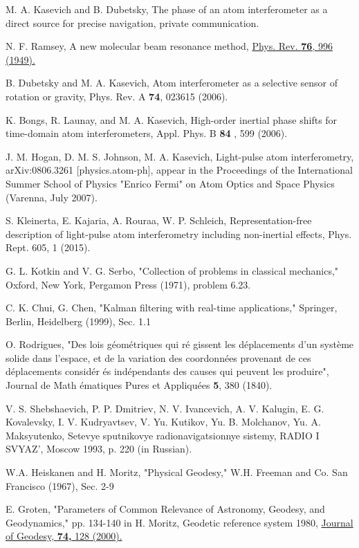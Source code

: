 \documentclass[twocolumn,showpacs,preprintnumbers]{revtex4}
\begin{document}
\begin{thebibliography}{99}
 M. A. Kasevich and B. Dubetsky, The phase of an atom
interferometer as a direct source for precise navigation, private
communication.

 N. F. Ramsey, A new molecular beam resonance method, \href{https://doi.org/10.1103/PhysRev.76.996}%
{Phys. Rev. \textbf{76}, 996 (1949).}

 B. Dubetsky and M. A. Kasevich, Atom interferometer as a
selective sensor of rotation or gravity, Phys. Rev. A \textbf{74}, 023615
(2006).

 K. Bongs, R. Launay, and M. A. Kasevich, High-order inertial
phase shifts for time-domain atom interferometers, Appl. Phys. B \textbf{84}%
, 599 (2006).

 J. M. Hogan, D. M. S. Johnson, M. A. Kasevich, Light-pulse
atom interferometry, arXiv:0806.3261 [physics.atom-ph], appear in the
Proceedings of the International Summer School of Physics "Enrico Fermi" on
Atom Optics and Space Physics (Varenna, July 2007).

 S. Kleinerta, E. Kajaria, A. Rouraa, W. P. Schleich,
Representation-free description of light-pulse atom interferometry including
non-inertial effects, Phys. Rept. 605, 1 (2015).

 G. L. Kotkin and V. G. Serbo, "Collection of problems in
classical mechanics," Oxford, New York, Pergamon Press (1971), problem 6.23.

 C. K. Chui, G. Chen, "Kalman filtering with real-time
applications," Springer, Berlin, Heidelberg (1999), Sec. 1.1

 O. Rodrigues, "Des lois g\'{e}om\'{e}triques qui r\'{e}%
gissent les d\'{e}placements d'un syst\`{e}me solide dans l'espace, et de la
variation des coordonn\'{e}es provenant de ces d\'{e}placements consid\'{e}r%
\'{e}s ind\'{e}pendants des causes qui peuvent les produire", Journal de Math%
\'{e}matiques Pures et Appliqu\'{e}es \textbf{5}, 380 (1840).

 V. S. Shebshaevich, P. P. Dmitriev, N. V. Ivancevich, A. V.
Kalugin, E. G. Kovalevsky, I. V. Kudryavtsev, V. Yu. Kutikov, Yu. B.
Molchanov, Yu. A. Maksyutenko, Setevye sputnikovye radionavigatsionnye
sistemy, RADIO I SVYAZ', Moscow 1993, p. 220 (in Russian).

 W.A. Heiskanen and H. Moritz, "Physical Geodesy," W.H. Freeman
and Co. San Francisco (1967), Sec. 2-9

 E. Groten, "Parameters of Common Relevance of Astronomy,
Geodesy, and Geodynamics," pp. 134-140 in H. Moritz, Geodetic reference
system 1980, \href{https://doi.org/10.1007/s001900050278}{Journal of
Geodesy, \textbf{74, }128 (2000).}


\end{thebibliography}
\end{document}
